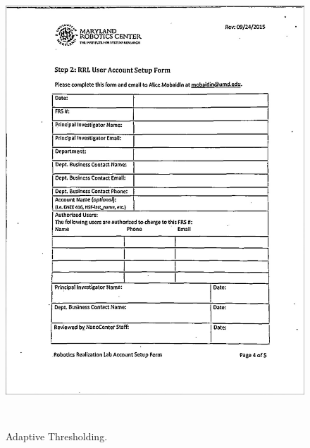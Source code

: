 \begin{figure}[th]
	\centering
	\includegraphics[height=17cm ]{Figures/adaptive_thresholding}
	\caption[AdaptiveThresholding]{Adaptive Thresholding.}
	\label{fig:AdaptiveThresholding}
\end{figure}






